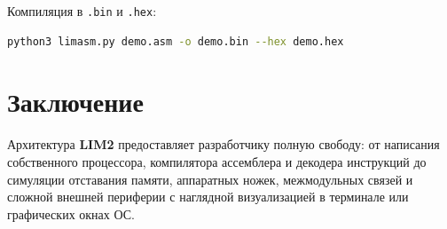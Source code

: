 \documentclass[11pt,a4paper]{article}
\begin{document}
Компиляция в \texttt{.bin} и \texttt{.hex}:
\begin{lstlisting}[language=bash]
python3 limasm.py demo.asm -o demo.bin --hex demo.hex
\end{lstlisting}

\section{Заключение}

Архитектура \textbf{LIM2} предоставляет разработчику полную свободу: от написания собственного процессора, компилятора ассемблера и декодера инструкций до симуляции отставания памяти, аппаратных ножек, межмодульных связей и сложной внешней периферии с наглядной визуализацией в терминале или графических окнах ОС.
\end{document}
